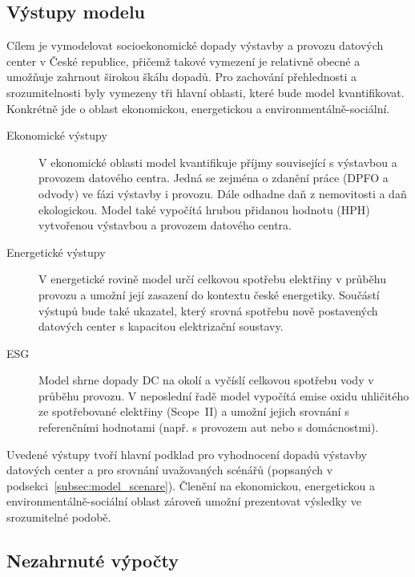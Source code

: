 \subsection{Výstupy modelu}
\label{subsec:model_vystupy}

Cílem je vymodelovat socioekonomické dopady výstavby a provozu datových center v České republice, přičemž takové vymezení je relativně obecné a umožňuje zahrnout širokou škálu dopadů. Pro zachování přehlednosti a srozumitelnosti byly vymezeny tři hlavní oblasti, které bude model kvantifikovat. Konkrétně jde o oblast ekonomickou, energetickou a environmentálně-sociální.

\begin{description}

	\item[Ekonomické výstupy] V ekonomické oblasti model kvantifikuje příjmy související s výstavbou a provozem datového centra. Jedná se zejména o zdanění práce (DPFO a odvody) ve fázi výstavby i provozu. Dále odhadne daň z nemovitosti a daň ekologickou. Model také vypočítá hrubou přidanou hodnotu (HPH) vytvořenou výstavbou a provozem datového centra.

	\item[Energetické výstupy] V energetické rovině model určí celkovou spotřebu elektřiny v průběhu provozu a umožní její zasazení do kontextu české energetiky. Součástí výstupů bude také ukazatel, který srovná spotřebu nově postavených datových center s kapacitou elektrizační soustavy.

	\item[ESG] Model shrne dopady DC na okolí a vyčíslí celkovou spotřebu vody v průběhu provozu. V neposlední řadě model vypočítá emise oxidu uhličitého ze spotřebované elektřiny (Scope~II) a umožní jejich srovnání s referenčními hodnotami (např. s provozem aut nebo s domácnostmi).
	
\end{description}

Uvedené výstupy tvoří hlavní podklad pro vyhodnocení dopadů výstavby datových center a pro srovnání uvažovaných scénářů (popsaných v podsekci~\ref{subsec:model_scenare}). Členění na ekonomickou, energetickou a environmentálně-sociální oblast zároveň umožní prezentovat výsledky ve srozumitelné podobě.

\subsection{Nezahrnuté výpočty}
\label{subsec:model_nezahrnute}

